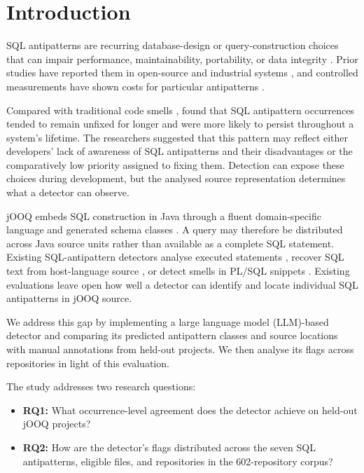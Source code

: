 \section{Introduction}\label{sec:introduction}

SQL antipatterns are recurring database-design or query-construction choices that can impair performance, maintainability, portability, or data integrity \citetext{\citealp[p. 1]{karwin2023sql}; \citealp[p. 4]{alshemaimri2021survey}}. Prior studies have reported them in open-source and industrial systems , and controlled measurements have shown costs for particular antipatterns \citetext{\citealp{lyu2019quantifying}; \citealp[pp. 2334--2335]{DBLP:conf/sigmod/DintyalaNA20}}.

Compared with traditional code smells ,  found that SQL antipattern occurrences tended to remain unfixed for longer and were more likely to persist throughout a system's lifetime. The researchers suggested that this pattern may reflect either developers' lack of awareness of SQL antipatterns and their disadvantages or the comparatively low priority assigned to fixing them. Detection can expose these choices during development, but the analysed source representation determines what a detector can observe.

jOOQ embeds SQL construction in Java through a fluent domain-specific language and generated schema classes . A query may therefore be distributed across Java source units rather than available as a complete SQL statement. Existing SQL-antipattern detectors analyse executed statements , recover SQL text from host-language source , or detect smells in PL/SQL snippets . Existing evaluations leave open how well a detector can identify and locate individual SQL antipatterns in jOOQ source.

We address this gap by implementing a large language model (LLM)-based detector and comparing its predicted antipattern classes and source locations with manual annotations from held-out projects. We then analyse its flags across repositories in light of this evaluation.

The study addresses two research questions:

\begin{itemize}
    \item \textbf{RQ1:} What occurrence-level agreement does the detector achieve on held-out jOOQ projects?
    \item \textbf{RQ2:} How are the detector's flags distributed across the seven SQL antipatterns, eligible files, and repositories in the 602-repository corpus?
\end{itemize}

